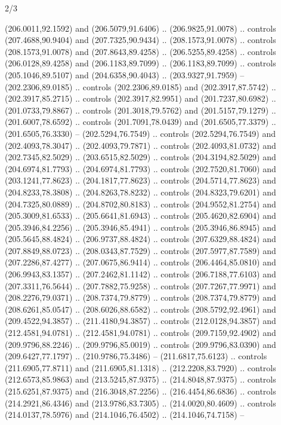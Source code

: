 \begin{flagdescription}{2/3}
\begin{scope}[xshift=0.5\flaglength,yshift=0.5\flagwidth,scale=\flagwidth/180]
\begin{scope}[y=0.8pt, x=0.8pt, yscale=-1,shift={(-168.75,-108.75)}]
  (206.0011,92.1592) and (206.5079,91.6406) .. (206.9825,91.0078) .. controls
  (207.4688,90.9404) and (207.7325,90.9434) .. (208.1573,91.0078) .. controls
  (208.1573,91.0078) and (207.8643,89.4258) .. (206.5255,89.4258) .. controls
  (206.0128,89.4258) and (206.1183,89.7099) .. (206.1183,89.7099) .. controls
  (205.1046,89.5107) and (204.6358,90.4043) .. (203.9327,91.7959) --
  (202.2306,89.0185) .. controls (202.2306,89.0185) and (202.3917,87.5742) ..
  (202.3917,85.2715) .. controls (202.3917,82.9951) and (201.7237,80.6982) ..
  (201.0733,79.8867) .. controls (201.3018,79.5762) and (201.5157,79.1279) ..
  (201.6007,78.6592) .. controls (201.7091,78.0439) and (201.6505,77.3379) ..
  (201.6505,76.3330) -- (202.5294,76.7549) .. controls (202.5294,76.7549) and
  (202.4093,78.3047) .. (202.4093,79.7871) .. controls (202.4093,81.0732) and
  (202.7345,82.5029) .. (203.6515,82.5029) .. controls (204.3194,82.5029) and
  (204.6974,81.7793) .. (204.6974,81.7793) .. controls (202.7520,81.7060) and
  (203.1241,77.8623) .. (204.1817,77.8623) .. controls (204.5714,77.8623) and
  (204.8233,78.3808) .. (204.8263,78.8232) .. controls (204.8323,79.6201) and
  (204.7325,80.0889) .. (204.8702,80.8183) .. controls (204.9552,81.2754) and
  (205.3009,81.6533) .. (205.6641,81.6943) .. controls (205.4620,82.6904) and
  (205.3946,84.2256) .. (205.3946,85.4941) .. controls (205.3946,86.8945) and
  (205.5645,88.4824) .. (206.9737,88.4824) .. controls (207.6329,88.4824) and
  (207.8849,88.0723) .. (208.0343,87.7529) .. controls (207.5977,87.7589) and
  (207.2286,87.4277) .. (207.0675,86.9414) .. controls (206.4464,85.0810) and
  (206.9943,83.1357) .. (207.2462,81.1142) .. controls (206.7188,77.6103) and
  (207.3311,76.5644) .. (207.7882,75.9258) .. controls (207.7267,77.9971) and
  (208.2276,79.0371) .. (208.7374,79.8779) .. controls (208.7374,79.8779) and
  (208.6261,85.0547) .. (208.6026,88.6582) .. controls (208.5792,92.4961) and
  (209.4522,94.3857) .. (211.4180,94.3857) .. controls (212.0128,94.3857) and
  (212.4581,94.0781) .. (212.4581,94.0781) .. controls (209.7159,92.4902) and
  (209.9796,88.2246) .. (209.9796,85.0019) .. controls (209.9796,83.0390) and
  (209.6427,77.1797) .. (210.9786,75.3486) -- (211.6817,75.6123) .. controls
  (211.6905,77.8711) and (211.6905,81.1318) .. (212.2208,83.7920) .. controls
  (212.6573,85.9863) and (213.5245,87.9375) .. (214.8048,87.9375) .. controls
  (215.6251,87.9375) and (216.3048,87.2256) .. (216.4454,86.6836) .. controls
  (214.2921,86.4346) and (213.9786,83.7305) .. (214.0020,80.4609) .. controls
  (214.0137,78.5976) and (214.1046,76.4502) .. (214.1046,74.7158) --

\end{scope}
\end{scope}
\end{flagdescription}
